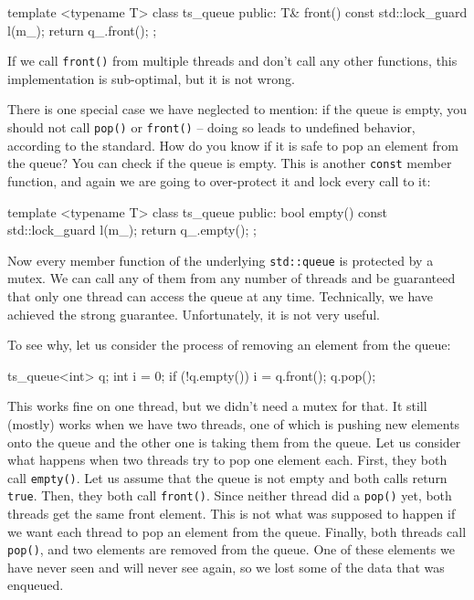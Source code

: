 \begin{code}
template <typename T> class ts_queue {
  public:
  T& front() const {
    std::lock_guard l(m_);
    return q_.front();
  }
};
\end{code}

If we call \texttt{front()} from multiple threads and don't call any other functions, this implementation is sub-optimal, but it is not wrong.

There is one special case we have neglected to mention: if the queue is empty, you should not call \texttt{pop()} or \texttt{front()} -- doing so leads to undefined behavior, according to the standard. How do you know if it is safe to pop an element from the queue? You can check if the queue is empty. This is another \texttt{const} member function, and again we are going to over-protect it and lock every call to it:

\begin{code}
template <typename T> class ts_queue {
  public:
  bool empty() const {
    std::lock_guard l(m_);
    return q_.empty();
  }
};
\end{code}

Now every member function of the underlying \texttt{std::queue} is protected by a mutex. We can call any of them from any number of threads and be guaranteed that only one thread can access the queue at any time. Technically, we have achieved the strong guarantee. Unfortunately, it is not very useful.

To see why, let us consider the process of removing an element from the queue:

\begin{code}
ts_queue<int> q;
int i = 0;
if (!q.empty()) {
  i = q.front();
  q.pop();
}
\end{code}

This works fine on one thread, but we didn't need a mutex for that. It still (mostly) works when we have two threads, one of which is pushing new elements onto the queue and the other one is taking them from the queue. Let us consider what happens when two threads try to pop one element each. First, they both call \texttt{empty()}. Let us assume that the queue is not empty and both calls return \texttt{true}. Then, they both call \texttt{front()}. Since neither thread did a \texttt{pop()} yet, both threads get the same front element. This is not what was supposed to happen if we want each thread to pop an element from the queue. Finally, both threads call \texttt{pop()}, and two elements are removed from the queue. One of these elements we have never seen and will never see again, so we lost some of the data that was enqueued.

